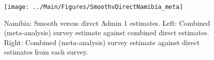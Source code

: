 \documentclass[12pt]{article}\usepackage[]{graphicx}\usepackage[]{color}
\newenvironment{knitrout}{}{} %
\begin{document}

\begin{knitrout}
\color{fgcolor}\begin{figure}[bht]

{\centering \texttt{[image: ../Main/Figures/SmoothvDirectNamibia\_meta]} 

}

\caption[Namibia]{Namibia: Smooth versus direct Admin 1 estimates. Left: Combined (meta-analysis) survey estimate against combined direct estimates. Right: Combined (meta-analysis) survey estimate against direct estimates from each survey.}\label{fig:unnamed-chunk-243}
\end{figure}


\end{knitrout}
\end{document}

